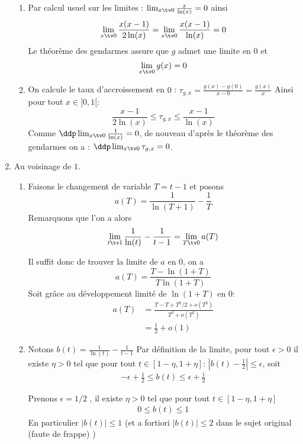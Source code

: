 \documentclass[a4paper, 11pt,reqno]{article}
\begin{document}
\begin{correction}
\begin{enumerate}
\begin{enumerate}
\item Par calcul usuel sur les limites : $\lim_{x\tv 0} \frac{x}{\ln(x)} =0$ ainsi 
$$\lim_{x\tv 0}  \frac{x(x-1)}{2\ln(x)} =\lim_{x\tv 0}  \frac{x(x-1)}{\ln(x)} =0$$
Le théorème des gendarmes assure que $g$ admet une limite en $0$ et 
$$\lim_{x\tv 0} g(x) =0$$


\item On calcule le taux d'accroissement en $0$ : 
$\tau_{g,x}   =\frac{g(x)-g(0)}{x-0}= \frac{g(x)}{x}$
Ainsi pour tout $x\in ]0,1[$: 
$$ \frac{x-1}{2\ln(x)}\leq \tau_{g,x}\leq \frac{x-1}{\ln(x)}$$
Comme $\ddp \lim_{x\tv 0} \frac{1}{\ln(x)} =0$, de nouveau d'après le théorème des gendarmes on a : $\ddp \lim_{x\tv 0} \tau_{g,x}  =0$.




\end{enumerate}
\item Au voisinage de $1$. 
\begin{enumerate}
\item 
Faisons le changement de variable $T= t-1$ et posons 
$$a(T) = \frac{1}{\ln(T+1)} - \frac{1}{T}$$
Remarquons que l'on a alors
$$\lim_{t\tv 1} \frac{1}{\ln(t)} -\frac{1}{t-1} = \lim_{T\tv 0 } a(T) $$

Il suffit donc de trouver la limite de $a$ en $0$, on a 
$$a(T) = \frac{T-\ln(1+T)}{T\ln(1+T)}$$
Soit grâce au développement limité de $\ln(1+T)$ en $0$:
\begin{align*}
a(T) &= \frac{T- T+T^2/2 +o(T^2)}{T^2+o(T^2)} \\
	& = \frac{1}{2} +o(1)
\end{align*}




\item Notons $b(t) = \frac{1}{\ln(t)} -\frac{1}{t-1}$ 
Par définition de la limite, pour tout $\epsilon >0 $ il existe $\eta >0 $ tel que pour tout $t\in [1-\eta, 1+\eta ] $: $|b(t)- \frac{1}{2}|\leq \epsilon$, soit
\begin{align*}
-\epsilon +\frac{1}{2}\leq b(t)\leq \epsilon +\frac{1}{2}
\end{align*}


Prenons $\epsilon = 1/2$ , il existe $\eta >0 $ tel que pour tout $t\in [1-\eta, 1+\eta ] $
\begin{align*}
0\leq  b(t)\leq 1
\end{align*}
En particulier $|b(t)|\leq 1 $ (et a fortiori $|b(t)|\leq 2 $ dans le sujet original (faute de frappe) )





\end{enumerate}
\end{enumerate}
\end{correction}
\end{document}
